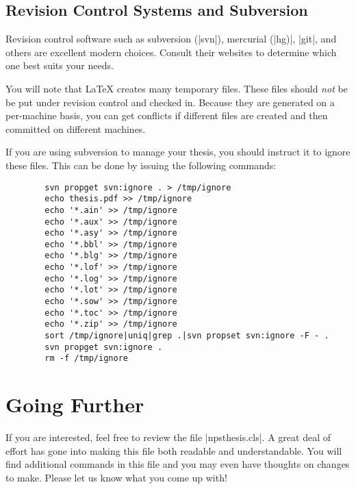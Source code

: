 \subsection{Revision Control Systems and Subversion}
Revision control software such as subversion (|svn|), mercurial (|hg)|, |git|, and others are excellent modern choices.  
Consult their websites to determine which one best suits your needs.

You will note that \LaTeX{} creates many temporary files. These files should \emph{not} be
be put under revision control and checked in. Because they are generated on a
per-machine basis, you can get conflicts if different files are
created and then committed on different machines.

If you are using subversion to manage your thesis, you should instruct it to ignore these files.  This
can be done by issuing the following commands:

\begin{Verbatim}
        svn propget svn:ignore . > /tmp/ignore
        echo thesis.pdf >> /tmp/ignore
        echo '*.ain' >> /tmp/ignore
        echo '*.aux' >> /tmp/ignore
        echo '*.asy' >> /tmp/ignore
        echo '*.bbl' >> /tmp/ignore
        echo '*.blg' >> /tmp/ignore
        echo '*.lof' >> /tmp/ignore
        echo '*.log' >> /tmp/ignore
        echo '*.lot' >> /tmp/ignore
        echo '*.sow' >> /tmp/ignore
        echo '*.toc' >> /tmp/ignore
        echo '*.zip' >> /tmp/ignore
        sort /tmp/ignore|uniq|grep .|svn propset svn:ignore -F - .
        svn propget svn:ignore .
        rm -f /tmp/ignore
\end{Verbatim}



\section{Going Further}
If you are interested, feel free to review the file
|npsthesis.cls|. A great deal of effort has gone into making this
file both readable and understandable. You will find additional
commands in this file and you may even have thoughts on changes to
make. Please let us know what you come up with!


